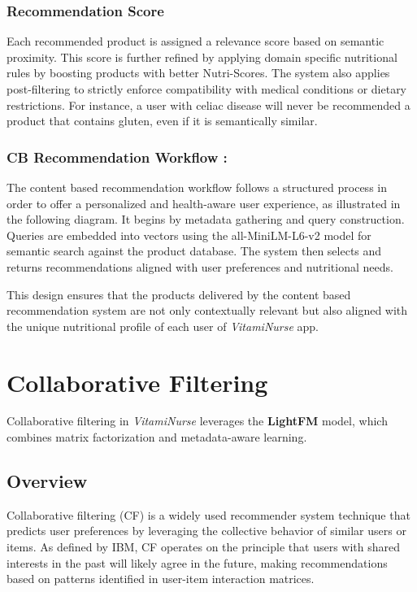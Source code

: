 \subsubsection{Recommendation Score}
\par Each recommended product is assigned a relevance score based on semantic proximity. This score is further refined by applying domain specific nutritional rules by boosting products with better Nutri-Scores. The system also applies post-filtering to strictly enforce compatibility with medical conditions or dietary restrictions. For instance, a user with celiac disease will never be recommended a product that contains gluten, even if it is semantically similar.

\subsubsection{CB Recommendation Workflow :}
The content based recommendation workflow follows a structured process in order to offer a personalized and health-aware user experience, as illustrated in the following diagram. It begins by metadata gathering and query construction. Queries are embedded into vectors using the all-MiniLM-L6-v2 model for semantic search against the product database. The system then selects and returns recommendations aligned with user preferences and nutritional needs.


\par This design ensures that the products delivered by the content based recommendation system are not only contextually relevant but also aligned with the unique nutritional profile of each user of \textit{VitamiNurse} app.

\vspace{0.4cm}
\section{Collaborative Filtering}
Collaborative filtering in \textit{VitamiNurse} leverages the \textbf{LightFM} model, which combines matrix factorization and metadata-aware learning. 
\subsection{Overview}

Collaborative filtering (CF) is a widely used recommender system technique that predicts user preferences by leveraging the collective behavior of similar users or items. As defined by IBM, CF operates on the principle that users with shared interests in the past will likely agree in the future, making recommendations based on patterns identified in user-item interaction matrices\cite{ibmCF}.

